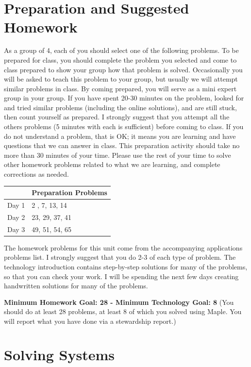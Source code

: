 \documentclass[10pt]{article}
\begin{document}
\section{Preparation and Suggested Homework}
As a group of 4, each of you should select one of the following problems. To be prepared for class, you should complete the problem you selected and come to class prepared to show your group how that problem is solved.  Occasionally you will be asked to teach this problem to your group, but usually we will attempt similar problems in class. By coming prepared, you will serve as a mini expert group in your group.  If you have spent 20-30 minutes on the problem, looked for and tried similar problems (including the online solutions), and are still stuck, then count yourself as prepared. I strongly suggest that you attempt all the others problems (5 minutes with each is sufficient) before coming to class. If you do not understand a problem, that is OK; it means you are learning and have questions that we can answer in class. This preparation activity should take no more than 30 minutes of your time.  Please use the rest of your time to solve other homework problems related to what we are learning, and complete corrections as needed.

\begin{center}
\begin{tabular}{ll}
&Preparation Problems\\
\hline\hline
Day 1& 2 , 7, 13, 14\\ \hline
Day 2& 23, 29, 37, 41\\ \hline
Day 3& 49, 51, 54, 65\\ \hline
\end{tabular}
\end{center}


The homework problems for this unit come from the accompanying applications problems list.  I strongly suggest that you do 2-3 of each type of problem. The technology introduction contains step-by-step solutions for many of the problems, so that you can check your work.  I will be spending the next few days creating handwritten solutions for many of the problems.

\textbf{
Minimum Homework Goal: 28 
- Minimum Technology Goal: 8 
}
(You should do at least 28 problems, at least 8 of which you solved using Maple. You will report what you have done via a stewardship report.)      



\section{Solving Systems}
\end{document}

